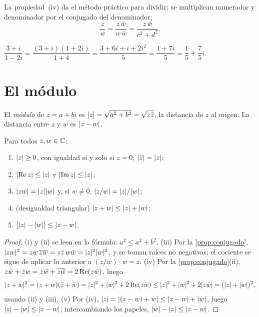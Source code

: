 La propiedad~(iv) da el método práctico para dividir: se multiplican numerador y denominador por el conjugado del denominador,
\[
\frac{z}{w}=\frac{z\,\bar w}{w\,\bar w}=\frac{z\,\bar w}{c^{2}+d^{2}} .
\]

\begin{ejemplo}\label{ej:division}
$\dfrac{3+i}{1-2i}=\dfrac{(3+i)(1+2i)}{1+4}=\dfrac{3+6i+i+2i^{2}}{5}=\dfrac{1+7i}{5}=\dfrac15+\dfrac75i$.
\end{ejemplo}

\section{El módulo}

\begin{definicion}[Módulo]
El \emph{módulo} de $z=a+bi$ es $\lvert z\rvert=\sqrt{a^{2}+b^{2}}=\sqrt{z\bar z}$, la distancia de $z$ al origen. La distancia entre $z$ y $w$ es $\lvert z-w\rvert$.
\end{definicion}

\begin{proposicion}\label{prop:modulo}
Para todos $z,w\in\mathbb{C}$:
\begin{enumerate}
  \item $\lvert z\rvert\ge0$, con igualdad si y solo si $z=0$; \quad $\lvert\bar z\rvert=\lvert z\rvert$;
  \item $\lvert\operatorname{Re} z\rvert\le\lvert z\rvert$ y $\lvert\operatorname{Im} z\rvert\le\lvert z\rvert$;
  \item $\lvert zw\rvert=\lvert z\rvert\lvert w\rvert$ y, si $w\ne0$, $\lvert z/w\rvert=\lvert z\rvert/\lvert w\rvert$;
  \item (desigualdad triangular) $\lvert z+w\rvert\le\lvert z\rvert+\lvert w\rvert$;
  \item $\bigl|\lvert z\rvert-\lvert w\rvert\bigr|\le\lvert z-w\rvert$.
\end{enumerate}
\end{proposicion}

\begin{proof}
(i) y (ii) se leen en la fórmula: $a^{2}\le a^{2}+b^{2}$. (iii) Por la \cref{prop:conjugado}, $\lvert zw\rvert^{2}=zw\,\overline{zw}=z\bar z\,w\bar w=\lvert z\rvert^{2}\lvert w\rvert^{2}$, y se toman raíces no negativas; el cociente se sigue de aplicar lo anterior a $(z/w)\cdot w=z$. (iv) Por la \cref{prop:conjugado}(ii), $z\bar w+\bar zw=z\bar w+\overline{z\bar w}=2\operatorname{Re}(z\bar w)$, luego
\[
\lvert z+w\rvert^{2}=(z+w)(\bar z+\bar w)=\lvert z\rvert^{2}+\lvert w\rvert^{2}+2\operatorname{Re}(z\bar w)\le\lvert z\rvert^{2}+\lvert w\rvert^{2}+2\lvert z\bar w\rvert=(\lvert z\rvert+\lvert w\rvert)^{2},
\]
usando (ii) y (iii). (v) Por (iv), $\lvert z\rvert=\lvert(z-w)+w\rvert\le\lvert z-w\rvert+\lvert w\rvert$, luego $\lvert z\rvert-\lvert w\rvert\le\lvert z-w\rvert$; intercambiando los papeles, $\lvert w\rvert-\lvert z\rvert\le\lvert z-w\rvert$.
\end{proof}

